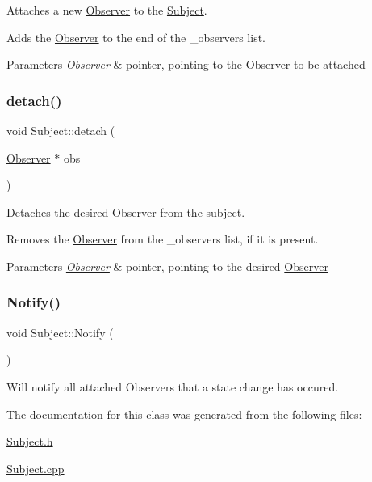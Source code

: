 Attaches a new \hyperlink{class_observer}{Observer} to the \hyperlink{class_subject}{Subject}. 

Adds the \hyperlink{class_observer}{Observer} to the end of the \+\_\+observers list. 
\begin{DoxyParams}{Parameters}
{\em \hyperlink{class_observer}{Observer}} & pointer, pointing to the \hyperlink{class_observer}{Observer} to be attached \\
\hline
\end{DoxyParams}
\hypertarget{class_subject_ad101324d66ad30b943e4fdc31dc16d14}{}\label{class_subject_ad101324d66ad30b943e4fdc31dc16d14} 
\subsubsection{\texorpdfstring{detach()}{detach()}}
{\footnotesize\ttfamily void Subject\+::detach (\begin{DoxyParamCaption}\item[{\hyperlink{class_observer}{Observer} $\ast$}]{obs }\end{DoxyParamCaption})\hspace{0.3cm}{\ttfamily [virtual]}}

Detaches the desired \hyperlink{class_observer}{Observer} from the subject. 

Removes the \hyperlink{class_observer}{Observer} from the \+\_\+observers list, if it is present. 
\begin{DoxyParams}{Parameters}
{\em \hyperlink{class_observer}{Observer}} & pointer, pointing to the desired \hyperlink{class_observer}{Observer} \\
\hline
\end{DoxyParams}
\hypertarget{class_subject_afdf01736ff099d286543b450d96215f1}{}\label{class_subject_afdf01736ff099d286543b450d96215f1} 
\subsubsection{\texorpdfstring{Notify()}{Notify()}}
{\footnotesize\ttfamily void Subject\+::\+Notify (\begin{DoxyParamCaption}{ }\end{DoxyParamCaption})\hspace{0.3cm}{\ttfamily [virtual]}}

Will notify all attached Observers that a state change has occured. 

The documentation for this class was generated from the following files\+:\begin{DoxyCompactItemize}
\item 
\hyperlink{_subject_8h}{Subject.\+h}\item 
\hyperlink{_subject_8cpp}{Subject.\+cpp}\end{DoxyCompactItemize}
